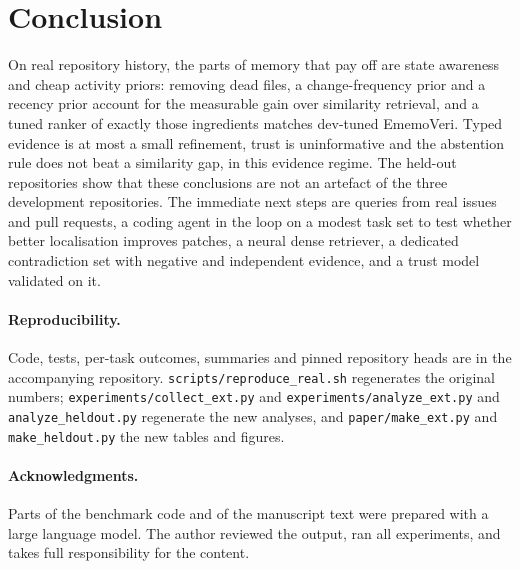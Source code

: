 \documentclass[runningheads]{llncs}
\newcommand{\sys}{EmemoVeri}
\begin{document}
\section{Conclusion}
On real repository history, the parts of memory that pay off are state awareness and cheap activity priors: removing dead files, a change-frequency prior and a recency prior account for the measurable gain over similarity retrieval, and a tuned ranker of exactly those ingredients matches dev-tuned \sys{}. Typed evidence is at most a small refinement, trust is uninformative and the abstention rule does not beat a similarity gap, in this evidence regime. The held-out repositories show that these conclusions are not an artefact of the three development repositories. The immediate next steps are queries from real issues and pull requests, a coding agent in the loop on a modest task set to test whether better localisation improves patches, a neural dense retriever, a dedicated contradiction set with negative and independent evidence, and a trust model validated on it.

\paragraph{Reproducibility.} Code, tests, per-task outcomes, summaries and pinned repository heads are in the accompanying repository. \texttt{scripts/}\allowbreak\texttt{reproduce\_real.sh} regenerates the original numbers; \texttt{experiments/}\allowbreak\texttt{collect\_ext.py} and \texttt{experiments/}\allowbreak\texttt{analyze\_ext.py} and \texttt{analyze\_heldout.py} regenerate the new analyses, and \texttt{paper/}\allowbreak\texttt{make\_ext.py} and \texttt{make\_heldout.py} the new tables and figures.

\paragraph{Acknowledgments.} Parts of the benchmark code and of the manuscript text were prepared with a large language model. The author reviewed the output, ran all experiments, and takes full responsibility for the content.



\end{document}
